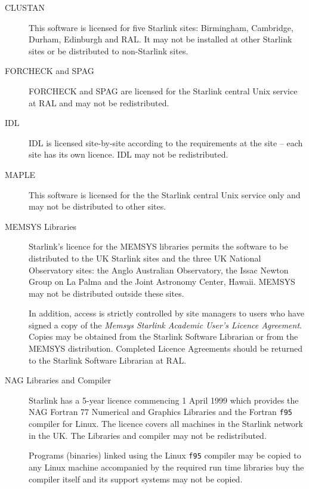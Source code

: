 \documentclass[twoside,11pt]{article}
\renewcommand{\_}{\texttt{\symbol{95}}}
\begin{document}
\begin{description}

\item[CLUSTAN]\mbox{}

This software is licensed for five Starlink sites: Birmingham, Cambridge,
Durham, Edinburgh and RAL\@.  It may not be installed at other Starlink sites 
or be distributed to non-Starlink sites.

\item[FORCHECK and SPAG]\mbox{}

FORCHECK and SPAG are licensed for the Starlink central Unix service at RAL
and may not be redistributed.

\item[IDL]\mbox{}

IDL is licensed site-by-site according to the requirements at the site -- each
site has its own licence.  IDL may not be redistributed.

\item[MAPLE]\mbox{}

This software is licensed for the the Starlink central Unix service only 
and may not be distributed to other sites.

\item[MEMSYS Libraries]\mbox{}

Starlink's licence for the MEMSYS libraries permits the software to be
distributed to the UK Starlink sites and the three UK National Observatory
sites: the Anglo Australian Observatory, the Issac Newton Group on La Palma 
and the Joint Astronomy Center, Hawaii.  MEMSYS may not be distributed outside
these sites.

In addition, access is strictly controlled by site managers to users who
have signed a copy of the \emph{Memsys Starlink Academic User's Licence
Agreement}.  Copies may be obtained from the Starlink Software Librarian
or from the MEMSYS distribution.  Completed Licence Agreements should be
returned to the Starlink Software Librarian at RAL.

\item[NAG Libraries and Compiler]\mbox{}

Starlink has a 5-year licence commencing 1 April 1999 which provides 
the NAG Fortran 77 Numerical and Graphics Libraries and the Fortran 
\texttt{f95} compiler for Linux.  The licence covers all machines in
the Starlink network in the UK\@.  The Libraries and compiler may not be
redistributed.

Programs (binaries) linked using the Linux \texttt{f95} compiler may be 
copied to any Linux machine accompanied by the required run time libraries
buy the compiler itself and its support systems may not be copied.


\end{description}
\end{document}
